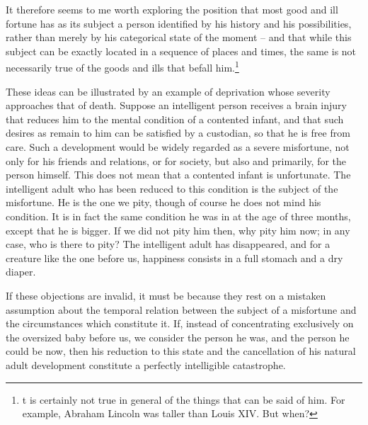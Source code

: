 It therefore seems to me worth exploring the position that most good and ill
fortune has as its subject a person identified by his history and his possibilities,
rather than merely by his categorical state of the moment – and that while this
subject can be exactly located in a sequence of places and times, the same is
not necessarily true of the goods and ills that befall him.\footnote{t is certainly not true in general of the things that can be said of him. For example, Abraham
Lincoln was taller than Louis XIV. But when?}

These ideas can be illustrated by an example of deprivation whose severity
approaches that of death. Suppose an intelligent person receives a brain injury
that reduces him to the mental condition of a contented infant, and that such
desires as remain to him can be satisfied by a custodian, so that he is free from
care. Such a development would be widely regarded as a severe misfortune,
not only for his friends and relations, or for society, but also and primarily, for
the person himself. This does not mean that a contented infant is unfortunate.
The intelligent adult who has been reduced to this condition is the subject of
the misfortune. He is the one we pity, though of course he does not mind his
condition. It is in fact the same condition he was in at the age of three months,
except that he is bigger. If we did not pity him then, why pity him now; in any
case, who is there to pity? The intelligent adult has disappeared, and for a
creature like the one before us, happiness consists in a full stomach and a dry
diaper.

If these objections are invalid, it must be because they rest on a mistaken
assumption about the temporal relation between the subject of a misfortune
and the circumstances which constitute it. If, instead of concentrating
exclusively on the oversized baby before us, we consider the person he was,
and the person he could be now, then his reduction to this state and the
cancellation of his natural adult development constitute a perfectly intelligible
catastrophe.

